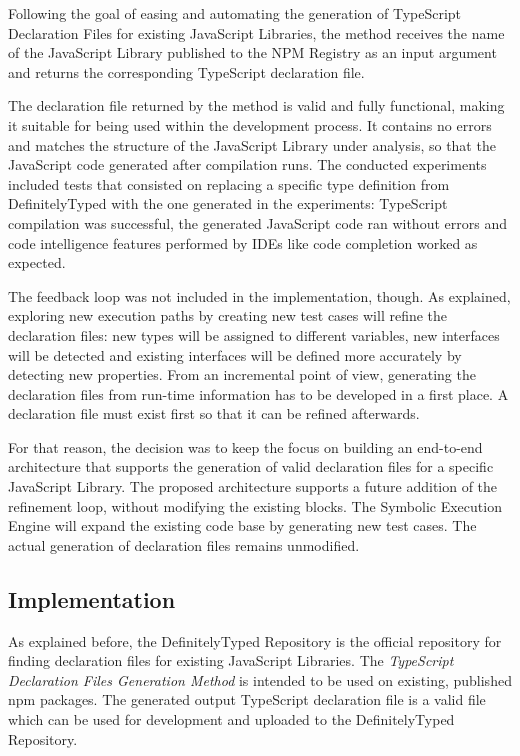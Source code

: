 Following the goal of easing and automating the generation of TypeScript Declaration Files for existing JavaScript Libraries, the method receives the name of the JavaScript Library published to the NPM Registry as an input argument and returns the corresponding TypeScript declaration file.

The declaration file returned by the method is valid and fully functional, making it suitable for being used within the development process. It contains no errors and matches the structure of the JavaScript Library under analysis, so that the JavaScript code generated after compilation runs. The conducted experiments included tests that consisted on replacing a specific type definition from DefinitelyTyped \citep{definitely-typed-repository} with the one generated in the experiments: TypeScript compilation was successful, the generated JavaScript code ran without errors and code intelligence features performed by IDEs like code completion worked as expected.

The feedback loop was not included in the implementation, though. As explained, exploring new execution paths by creating new test cases will refine the declaration files: new types will be assigned to different variables, new interfaces will be detected and existing interfaces will be defined more accurately by detecting new properties. From an incremental point of view, generating the declaration files from run-time information has to be developed in a first place. A declaration file must exist first so that it can be refined afterwards.

For that reason, the decision was to keep the focus on building an end-to-end architecture that supports the generation of valid declaration files for a specific JavaScript Library. The proposed architecture supports a future addition of the refinement loop, without modifying the existing blocks. The Symbolic Execution Engine will expand the existing code base by generating new test cases. The actual generation of declaration files remains unmodified. 

\subsection{Implementation}
As explained before, the DefinitelyTyped Repository is the official repository for finding declaration files for existing JavaScript Libraries. The \textit{TypeScript Declaration Files Generation Method} is intended to be used on existing, published npm packages. The generated output TypeScript declaration file is a valid file which can be used for development and uploaded to the DefinitelyTyped Repository.

